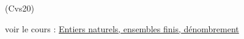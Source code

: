 \begin{tiny}(Cvs20)\end{tiny}voir le cours : \href{\coursurl C2007.pdf}{Entiers naturels, ensembles finis, dénombrement}